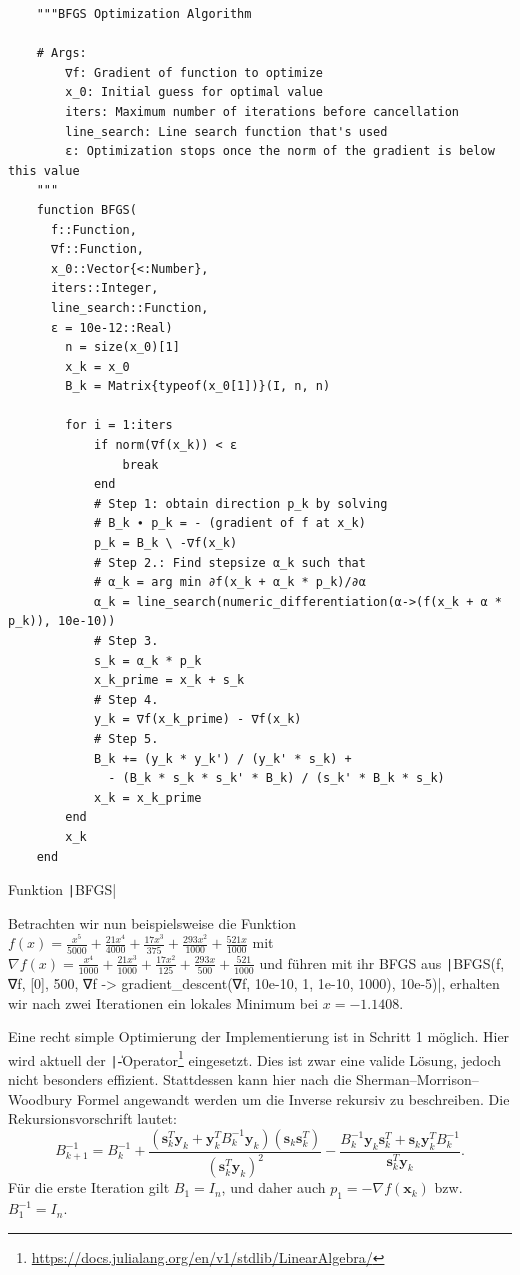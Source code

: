 \documentclass{article}
\theoremstyle{plain} %
\theoremstyle{definition} %
\begin{document}
\begin{listing}[H]
  \begin{verbatim}
    """BFGS Optimization Algorithm

    # Args:
        ∇f: Gradient of function to optimize
        x_0: Initial guess for optimal value
        iters: Maximum number of iterations before cancellation
        line_search: Line search function that's used
        ε: Optimization stops once the norm of the gradient is below this value
    """
    function BFGS(
      f::Function,
      ∇f::Function, 
      x_0::Vector{<:Number}, 
      iters::Integer,
      line_search::Function,
      ε = 10e-12::Real)
        n = size(x_0)[1]
        x_k = x_0
        B_k = Matrix{typeof(x_0[1])}(I, n, n)

        for i = 1:iters
            if norm(∇f(x_k)) < ε
                break
            end
            # Step 1: obtain direction p_k by solving
            # B_k ∙ p_k = - (gradient of f at x_k)
            p_k = B_k \ -∇f(x_k)
            # Step 2.: Find stepsize α_k such that
            # α_k = arg min ∂f(x_k + α_k * p_k)/∂α
            α_k = line_search(numeric_differentiation(α->(f(x_k + α * p_k)), 10e-10))
            # Step 3.
            s_k = α_k * p_k
            x_k_prime = x_k + s_k
            # Step 4.
            y_k = ∇f(x_k_prime) - ∇f(x_k)
            # Step 5.
            B_k += (y_k * y_k') / (y_k' * s_k) +
              - (B_k * s_k * s_k' * B_k) / (s_k' * B_k * s_k)
            x_k = x_k_prime
        end
        x_k
    end
  \end{verbatim}
  \caption{Funktion \texttt|BFGS|}
  \label{listing:decay}
\end{listing}

Betrachten wir nun beispielsweise die Funktion $f(x) = \frac{x^5}{5000} + \frac{21 x^4}{4000} + \frac{17 x^3}{375} + \frac{293 x^2}{1000} + \frac{521 x}{1000}$ mit $\nabla f(x) = \frac{x^4}{1000} + \frac{21x^3}{1000} + \frac{17 x^2}{125} + \frac{293 x}{500} + \frac{521}{1000}$ und führen mit ihr BFGS aus
\texttt|BFGS(f, ∇f, [0], 500, ∇f -> gradient_descent(∇f, 10e-10, 1, 1e-10, 1000), 10e-5)|,
erhalten wir nach zwei Iterationen ein lokales Minimum bei $x=-1.1408$.

Eine recht simple Optimierung der Implementierung ist in Schritt 1 möglich. Hier wird aktuell der \texttt|\|-Operator\footnote{\url{https://docs.julialang.org/en/v1/stdlib/LinearAlgebra/}} eingesetzt. Dies ist zwar eine valide Lösung, jedoch nicht besonders effizient. Stattdessen kann hier nach \cite{wiki:BFGS} die Sherman–Morrison–Woodbury Formel angewandt werden um die Inverse rekursiv zu beschreiben. Die Rekursionsvorschrift lautet:
$$
B_{k+1}^{-1} = B_k^{-1} + \frac{(\mathbf{s}_k^T \mathbf{y}_k + \mathbf{y}_k^T B_k^{-1} \mathbf{y}_k)(\mathbf{s}_k \mathbf{s}_k^T)}{(\mathbf{s}_k^T \mathbf{y}_k)^2} - \frac{B_k^{-1} \mathbf{y}_k \mathbf{s}_k^T + \mathbf{s}_k \mathbf{y}_k^T B_k^{-1}}{\mathbf{s}_k^T \mathbf{y}_k}.
$$
Für die erste Iteration gilt $B_1 = I_n$, und daher auch $p_1 = -\nabla f(\mathbf{x}_k)$ bzw. $B_1^{-1} = I_n$.
\end{document}
